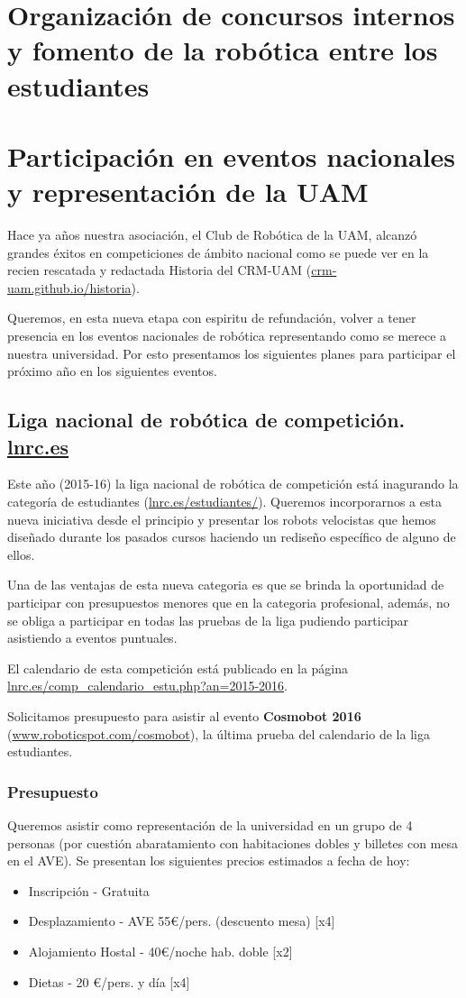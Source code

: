 \documentclass[12pt,twoside]{report}
\begin{document}
\section{Organización de concursos internos y fomento de la robótica entre los estudiantes}


\section{Participación en eventos nacionales y representación de la UAM}

Hace ya años nuestra asociación, el Club de Robótica de la UAM, alcanzó grandes éxitos en competiciones de ámbito nacional como se puede ver en la recien rescatada y redactada Historia del CRM-UAM (\url{crm-uam.github.io/historia}).

Queremos, en esta nueva etapa con espiritu de refundación, volver a tener presencia en los eventos nacionales de robótica representando como se merece a nuestra universidad. Por esto presentamos los siguientes planes para participar el próximo año en los siguientes eventos.

\subsection{Liga nacional de robótica de competición. \url{lnrc.es}}
Este año (2015-16) la liga nacional de robótica de competición está inagurando la categoría de estudiantes (\url{lnrc.es/estudiantes/}). Queremos incorporarnos a esta nueva iniciativa desde el principio y presentar los robots velocistas que hemos diseñado durante los pasados cursos haciendo un rediseño específico de alguno de ellos.

Una de las ventajas de esta nueva categoria es que se brinda la oportunidad de participar con presupuestos menores que en la categoria profesional, además, no se obliga a participar en todas las pruebas de la liga pudiendo participar asistiendo a eventos puntuales.

El calendario de esta competición está publicado en la página \url{lnrc.es/comp_calendario_estu.php?an=2015-2016}.

Solicitamos presupuesto para asistir al evento {\bf Cosmobot 2016} (\url{www.roboticspot.com/cosmobot}), la última prueba del calendario de la liga estudiantes.

\subsubsection{Presupuesto}
Queremos asistir como representación de la universidad en un grupo de 4 personas (por cuestión abaratamiento con habitaciones dobles y billetes con mesa en el AVE). Se presentan los siguientes precios estimados a fecha de hoy:
\begin{itemize}
\item Inscripción - Gratuita
\item Desplazamiento - AVE 55\euro{}/pers. (descuento mesa) [x4]
\item Alojamiento Hostal - 40\euro{}/noche hab. doble [x2]
\item Dietas - 20 \euro{}/pers. y día [x4]
\end{itemize}
\end{document}
